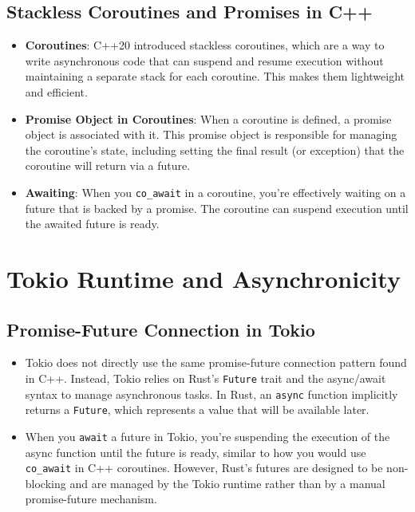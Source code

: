 \documentclass{article}
\begin{document}
\subsection{Stackless Coroutines and Promises in C++}
\begin{itemize}
    \item \textbf{Coroutines}: C++20 introduced stackless coroutines, which are a way to write asynchronous code that can suspend and resume execution without maintaining a separate stack for each coroutine. This makes them lightweight and efficient.
    \item \textbf{Promise Object in Coroutines}: When a coroutine is defined, a promise object is associated with it. This promise object is responsible for managing the coroutine's state, including setting the final result (or exception) that the coroutine will return via a future.
    \item \textbf{Awaiting}: When you \texttt{co\_await} in a coroutine, you're effectively waiting on a future that is backed by a promise. The coroutine can suspend execution until the awaited future is ready.
\end{itemize}

\section{Tokio Runtime and Asynchronicity}

\subsection{Promise-Future Connection in Tokio}
\begin{itemize}
    \item Tokio does not directly use the same promise-future connection pattern found in C++. Instead, Tokio relies on Rust's \texttt{Future} trait and the async/await syntax to manage asynchronous tasks. In Rust, an \texttt{async} function implicitly returns a \texttt{Future}, which represents a value that will be available later.
    \item When you \texttt{await} a future in Tokio, you're suspending the execution of the async function until the future is ready, similar to how you would use \texttt{co\_await} in C++ coroutines. However, Rust’s futures are designed to be non-blocking and are managed by the Tokio runtime rather than by a manual promise-future mechanism.
\end{itemize}
\end{document}
